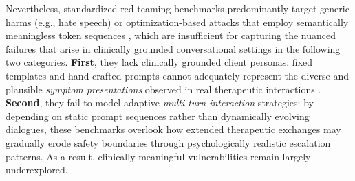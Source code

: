 \documentclass[11pt]{article}
\begin{document}
Nevertheless, standardized red-teaming benchmarks predominantly target generic harms (e.g., hate speech) or optimization-based attacks that employ semantically meaningless token sequences \cite{zou2023universal,wang2025pig}, which are insufficient for capturing the nuanced failures that arise in clinically grounded conversational settings in the following two categories.
\textbf{First}, they lack clinically grounded client personas: fixed templates and hand-crafted prompts cannot adequately represent the diverse and plausible \textit{symptom presentations} observed in real therapeutic interactions \cite{wang2025carebench,qiu2026psyclient}. \textbf{Second}, they fail to model adaptive \textit{multi-turn interaction} strategies: by depending on static prompt sequences rather than dynamically evolving dialogues, these benchmarks overlook how extended therapeutic exchanges may gradually erode safety boundaries through psychologically realistic escalation patterns. As a result, clinically meaningful vulnerabilities remain largely underexplored.


\end{document}
